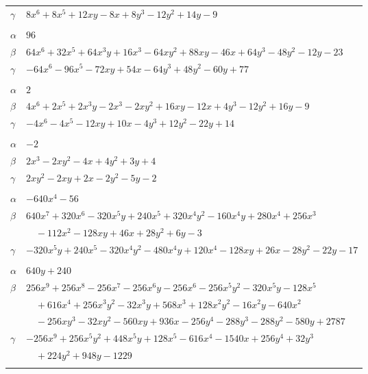 \documentclass[11pt]{article}
\begin{document}
\begin{longtable}{@{}ll@{}}
$\gamma$ & $8x^{6}+8x^{5}+12xy-8x+8y^{3}-12y^{2}+14y-9$\\
\addlinespace[3pt]
\multicolumn{2}{@{}l}{$\{i,j\}=\{26,36\}$, $k_{ij}=3^{4}$}\\
$\alpha$ & $96$\\
$\beta$ & $64x^{6}+32x^{5}+64x^{3}y+16x^{3}-64xy^{2}+88xy-46x+64y^{3}-48y^{2}-12y-23$\\
$\gamma$ & $-64x^{6}-96x^{5}-72xy+54x-64y^{3}+48y^{2}-60y+77$\\
\addlinespace[3pt]
\multicolumn{2}{@{}l}{$\{i,j\}=\{28,30\}$, $k_{ij}=2$}\\
$\alpha$ & $2$\\
$\beta$ & $4x^{6}+2x^{5}+2x^{3}y-2x^{3}-2xy^{2}+16xy-12x+4y^{3}-12y^{2}+16y-9$\\
$\gamma$ & $-4x^{6}-4x^{5}-12xy+10x-4y^{3}+12y^{2}-22y+14$\\
\addlinespace[3pt]
\multicolumn{2}{@{}l}{$\{i,j\}=\{29,36\}$, $k_{ij}=2\cdot 3$}\\
$\alpha$ & $-2$\\
$\beta$ & $2x^{3}-2xy^{2}-4x+4y^{2}+3y+4$\\
$\gamma$ & $2xy^{2}-2xy+2x-2y^{2}-5y-2$\\
\addlinespace[3pt]
\multicolumn{2}{@{}l}{$\{i,j\}=\{30,40\}$, $k_{ij}=2\cdot 3\cdot 7$}\\
$\alpha$ & $-640x^{4}-56$\\
$\beta$ & $640x^{7}+320x^{6}-320x^{5}y+240x^{5}+320x^{4}y^{2}-160x^{4}y+280x^{4}+256x^{3}$\\
 & $\quad -112x^{2}-128xy+46x+28y^{2}+6y-3$\\
$\gamma$ & $-320x^{5}y+240x^{5}-320x^{4}y^{2}-480x^{4}y+120x^{4}-128xy+26x-28y^{2}-22y-17$\\
\addlinespace[3pt]
\multicolumn{2}{@{}l}{$\{i,j\}=\{31,34\}$, $k_{ij}=5\cdot 7\cdot 11\cdot 13$}\\
$\alpha$ & $640y+240$\\
$\beta$ & $256x^{9}+256x^{8}-256x^{7}-256x^{6}y-256x^{6}-256x^{5}y^{2}-320x^{5}y-128x^{5}$\\
 & $\quad +616x^{4}+256x^{3}y^{2}-32x^{3}y+568x^{3}+128x^{2}y^{2}-16x^{2}y-640x^{2}$\\
 & $\quad -256xy^{3}-32xy^{2}-560xy+936x-256y^{4}-288y^{3}-288y^{2}-580y+2787$\\
$\gamma$ & $-256x^{9}+256x^{5}y^{2}+448x^{5}y+128x^{5}-616x^{4}-1540x+256y^{4}+32y^{3}$\\
 & $\quad +224y^{2}+948y-1229$\\
\addlinespace[3pt]

\end{longtable}
\end{document}
